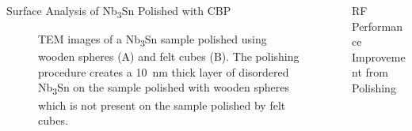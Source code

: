 \documentclass{beamer}
\begin{document}
\begin{frame}{}
\begin{columns}[t]
\begin{column}{0.32\linewidth}
\begin{block}{\label{sec:samplestudy}Surface Analysis of Nb\textsubscript{3}Sn Polished with CBP}
\begin{figure}
\begin{columns}
                            \caption{TEM images of a Nb\textsubscript{3}Sn sample polished using wooden spheres (A) and felt cubes (B). The polishing procedure creates a 10~nm thick layer of disordered Nb\textsubscript{3}Sn on the sample polished with wooden spheres which is not present on the sample polished by felt cubes.}
                            \label{fig:samplesurfacedamagelayer}
                        \end{columns}
                    \end{figure}
                \end{block}
            \end{column}





            \begin{column}{0.32\textwidth}
                \begin{block}{\label{sec:cavitycbp}RF Performance Improvement from Polishing}
                    \begin{columns}
                        \begin{column}{0.55\columnwidth}
                            \begin{figure}[t]
                                \centering

\end{figure}
\end{column}
\end{columns}
\end{block}
\end{column}
\end{columns}
\end{frame}
\end{document}
